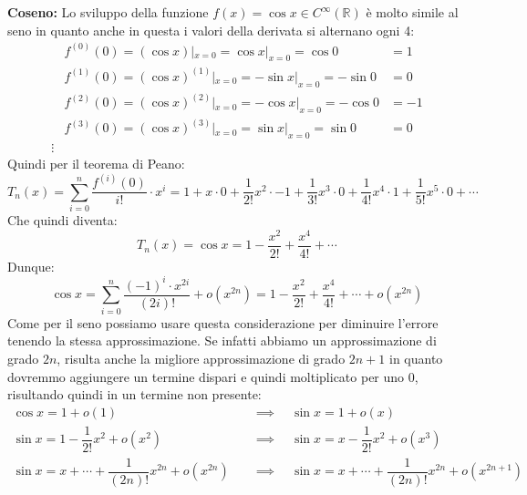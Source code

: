 \textbf{Coseno:} Lo sviluppo della funzione $f(x) = \cos{x} \in C^\infty(\mathbb{R})$ è molto simile al seno in quanto anche in questa i valori della derivata si alternano ogni 4:
\begin{align*}
	&f^{(0)}(0) = (\cos{x}) |_{x = 0} = \cos{x} |_{x = 0} = \cos{0} &= 1\\[5pt]
	&f^{(1)}(0) = (\cos{x})^{(1)}|_{x = 0} = -\sin{x} |_{x = 0} = -\sin{0} &= 0\\[5pt]
	&f^{(2)}(0) = (\cos{x})^{(2)} |_{x = 0} = -\cos{x} |_{x = 0} = -\cos{0} &= -1\\[5pt]
	&f^{(3)}(0) = (\cos{x})^{(3)} |_{x = 0} = \sin{x} |_{x = 0} = \sin{0} &= 0\\
	\vdots
\end{align*}
Quindi per il teorema di Peano:
\begin{equation*}
	T_n(x) = \sum \limits_{i = 0}^n \dfrac{f^{(i)}(0)}{i!} \cdot x^i = 1 + x \cdot 0 + \dfrac{1}{2!}x^2 \cdot -1 + \dfrac{1}{3!}x^3 \cdot 0 + \dfrac{1}{4!}x^4 \cdot 1 + \dfrac{1}{5!}x^5 \cdot 0 + \cdots 
\end{equation*}
Che quindi diventa:
\begin{equation*}
	T_n(x) = \cos{x} = 1 - \dfrac{x^2}{2!} + \dfrac{x^4}{4!} + \cdots
\end{equation*}
Dunque:
\begin{equation*}
	\cos{x} = \sum \limits_{i = 0}^n \dfrac{(-1)^i \cdot x^{2i}}{(2i)!} + o(x^{2n}) = 1 - \dfrac{x^2}{2!} + \dfrac{x^4}{4!} + \cdots + o(x^{2n})
\end{equation*}
Come per il seno possiamo usare questa considerazione per diminuire l'errore tenendo la stessa approssimazione. Se infatti abbiamo un approssimazione di grado $2n$, risulta anche la migliore approssimazione di grado $2n + 1$ in quanto dovremmo aggiungere un termine dispari e quindi moltiplicato per uno 0, risultando quindi in un termine non presente:
\begin{align*}
	\cos{x} = 1 + o(1) \quad &\implies \quad \sin{x} = 1 + o(x)\\[5pt]
	\sin{x} = 1 - \dfrac{1}{2!}x^2 + o(x^2) \quad &\implies \quad \sin{x} = x - \dfrac{1}{2!}x^2 + o(x^3) \\[5pt]
	\sin{x} = x + \cdots + \dfrac{1}{(2n)!} x^{2n} + o(x^{2n}) \quad &\implies \quad \sin{x} = x + \cdots + \dfrac{1}{(2n)!} x^{2n} + o(x^{2n+1})
\end{align*}




